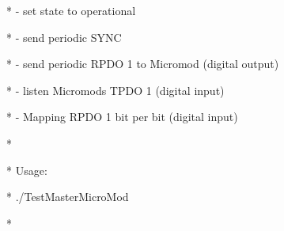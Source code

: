\documentclass[a4paper,12pt]{book}
\begin{document}
{\ttfamily
* \space {}- set state to operational
\space \space \space \space \space \space \space \space \space \space \space \space \space \space \space \space \space \space \space \space \space \space \space \space \space \space \space \space \space \space \space *}

{\ttfamily
* \space {}- send periodic SYNC
\space \space \space \space \space \space \space \space \space \space \space \space \space \space \space \space \space \space \space \space \space \space \space \space \space \space \space \space \space \space \space \space \space \space \space \space \space *}

{\ttfamily
* \space {}- send periodic RPDO 1 to Micromod (digital output) \space \space \space \space \space \space *}

{\ttfamily
* \space {}- listen Micromod{\textquotesingle}s TPDO 1 (digital input)
\space \space \space \space \space \space \space \space \space \space \space \space \space \space \space *}

{\ttfamily
* \space {}- Mapping RPDO 1 bit per bit (digital input)
\space \space \space \space \space \space \space \space \space \space \space \space \space *}

{\ttfamily
*
\space \space \space \space \space \space \space \space \space \space \space \space \space \space \space \space \space \space \space \space \space \space \space \space \space \space \space \space \space \space \space \space \space \space \space \space \space \space \space \space \space \space \space \space \space \space \space \space \space \space \space \space \space \space \space \space \space \space \space *}

{\ttfamily
* \space \space Usage:
\space \space \space \space \space \space \space \space \space \space \space \space \space \space \space \space \space \space \space \space \space \space \space \space \space \space \space \space \space \space \space \space \space \space \space \space \space \space \space \space \space \space \space \space \space \space \space \space \space \space *}

{\ttfamily
* \space \space ./TestMasterMicroMod \space [OPTIONS]
\space \space \space \space \space \space \space \space \space \space \space \space \space \space \space \space \space \space \space \space \space \space \space \space \space *}

{\ttfamily
*
\space \space \space \space \space \space \space \space \space \space \space \space \space \space \space \space \space \space \space \space \space \space \space \space \space \space \space \space \space \space \space \space \space \space \space \space \space \space \space \space \space \space \space \space \space \space \space \space \space \space \space \space \space \space \space \space \space \space \space *}
\end{document}
